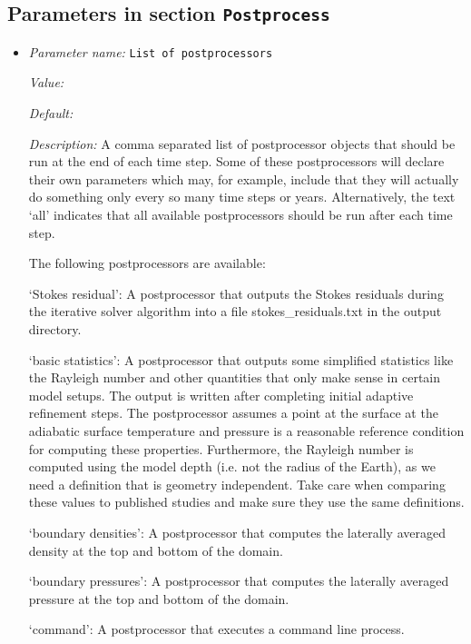 \subsection{Parameters in section \tt Postprocess}
\label{parameters:Postprocess}

\begin{itemize}
\item {\it Parameter name:} {\tt List of postprocessors}
\label{parameters:Postprocess/List of postprocessors}


{\it Value:} 


{\it Default:} 


{\it Description:} A comma separated list of postprocessor objects that should be run at the end of each time step. Some of these postprocessors will declare their own parameters which may, for example, include that they will actually do something only every so many time steps or years. Alternatively, the text `all' indicates that all available postprocessors should be run after each time step.

The following postprocessors are available:

`Stokes residual': A postprocessor that outputs the Stokes residuals during the iterative solver algorithm into a file stokes\_residuals.txt in the output directory.

`basic statistics': A postprocessor that outputs some simplified statistics like the Rayleigh number and other quantities that only make sense in certain model setups. The output is written after completing initial adaptive refinement steps. The postprocessor assumes a point at the surface at the adiabatic surface temperature and pressure is a reasonable reference condition for computing these properties. Furthermore, the Rayleigh number is computed using the model depth (i.e. not the radius of the Earth), as we need a definition that is geometry independent. Take care when comparing these values to published studies and make sure they use the same definitions.

`boundary densities': A postprocessor that computes the laterally averaged density at the top and bottom of the domain.

`boundary pressures': A postprocessor that computes the laterally averaged pressure at the top and bottom of the domain.

`command': A postprocessor that executes a command line process.


\end{itemize}

